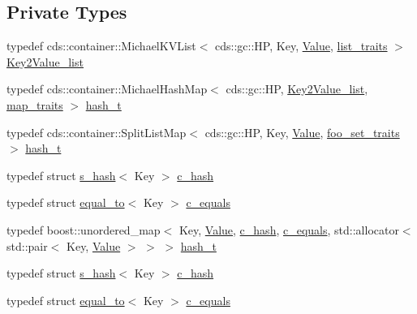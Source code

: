\subsection*{Private Types}
\begin{DoxyCompactItemize}
\item 
typedef cds\+::container\+::\+Michael\+K\+V\+List$<$ cds\+::gc\+::\+H\+P, Key, \hyperlink{hash__map_2test_object_8h_ad777bf08d8e2b01df17ba5e3c51ae11f}{Value}, \hyperlink{struct_test_class_1_1list__traits}{list\+\_\+traits} $>$ \hyperlink{class_test_class_a5c18ae754153ec12a6591663ca817565}{Key2\+Value\+\_\+list}
\item 
typedef cds\+::container\+::\+Michael\+Hash\+Map$<$ cds\+::gc\+::\+H\+P, \hyperlink{class_test_class_a5c18ae754153ec12a6591663ca817565}{Key2\+Value\+\_\+list}, \hyperlink{struct_test_class_1_1map__traits}{map\+\_\+traits} $>$ \hyperlink{class_test_class_acff06dce1120b0a2879c55f7a5e5acc7}{hash\+\_\+t}
\item 
typedef cds\+::container\+::\+Split\+List\+Map$<$ cds\+::gc\+::\+H\+P, Key, \hyperlink{hash__map_2test_object_8h_ad777bf08d8e2b01df17ba5e3c51ae11f}{Value}, \hyperlink{struct_test_class_1_1foo__set__traits}{foo\+\_\+set\+\_\+traits} $>$ \hyperlink{class_test_class_a8220399a41bb1a4b93273090306ea770}{hash\+\_\+t}
\item 
typedef struct \hyperlink{struct_test_class_1_1s__hash}{s\+\_\+hash}$<$ Key $>$ \hyperlink{class_test_class_ac0d14c72d1a7e359213955041bd3eea5}{c\+\_\+hash}
\item 
typedef struct \hyperlink{struct_test_class_1_1equal__to}{equal\+\_\+to}$<$ Key $>$ \hyperlink{class_test_class_aafbd6570cd1aa88768f912c15ca188b5}{c\+\_\+equals}
\item 
typedef boost\+::unordered\+\_\+map$<$ Key, \hyperlink{hash__map_2test_object_8h_ad777bf08d8e2b01df17ba5e3c51ae11f}{Value}, \hyperlink{class_test_class_ac0d14c72d1a7e359213955041bd3eea5}{c\+\_\+hash}, \hyperlink{class_test_class_aafbd6570cd1aa88768f912c15ca188b5}{c\+\_\+equals}, std\+::allocator$<$ std\+::pair$<$ Key, \hyperlink{hash__map_2test_object_8h_ad777bf08d8e2b01df17ba5e3c51ae11f}{Value} $>$ $>$ $>$ \hyperlink{class_test_class_a8169ffe4884a5ad6488eb7893452ebb1}{hash\+\_\+t}
\item 
typedef struct \hyperlink{struct_test_class_1_1s__hash}{s\+\_\+hash}$<$ Key $>$ \hyperlink{class_test_class_ac0d14c72d1a7e359213955041bd3eea5}{c\+\_\+hash}
\item 
typedef struct \hyperlink{struct_test_class_1_1equal__to}{equal\+\_\+to}$<$ Key $>$ \hyperlink{class_test_class_aafbd6570cd1aa88768f912c15ca188b5}{c\+\_\+equals}

\end{DoxyCompactItemize}
